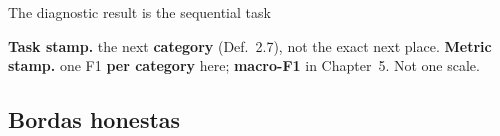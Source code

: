 \documentclass{beamer}
\begin{document}
\begin{frame}{The diagnostic result is the sequential task}
    \vfill
    {\scriptsize\color{secondary}\textbf{Task stamp.} the next \textbf{category} (Def.~2.7), not
    the exact next place. \quad\textbf{Metric stamp.} one F1 \textbf{per category} here;
    \textbf{macro-F1} in Chapter~5. Not one scale.\par}
\end{frame}

\subsection{Bordas honestas}

\end{document}
